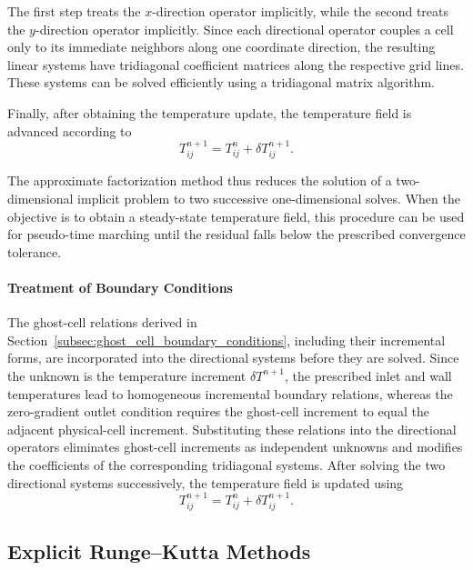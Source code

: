 The first step treats the $x$-direction operator implicitly,
while the second treats the $y$-direction operator
implicitly. Since each directional operator couples a
cell only to its immediate neighbors along one coordinate
direction, the resulting linear systems have tridiagonal
coefficient matrices along the respective grid lines.
These systems can be solved efficiently using a
tridiagonal matrix algorithm.

Finally, after obtaining the temperature update, the
temperature field is advanced according to
\begin{equation}
\boxed{
T_{ij}^{n+1}=T_{ij}^{n}+\delta T_{ij}^{n+1}.
}
\label{eq:temperature_update_final}
\end{equation}

The approximate factorization method thus reduces the
solution of a two-dimensional implicit problem to two
successive one-dimensional solves. When the objective is
to obtain a steady-state temperature field, this procedure
can be used for pseudo-time marching until the residual
falls below the prescribed convergence tolerance.

\paragraph{Treatment of Boundary Conditions}

The ghost-cell relations derived in
Section~\ref{subsec:ghost_cell_boundary_conditions}, including
their incremental forms, are incorporated into the directional
systems before they are solved. Since the unknown is the
temperature increment $\delta T^{n+1}$, the prescribed inlet
and wall temperatures lead to homogeneous incremental
boundary relations, whereas the zero-gradient outlet condition
requires the ghost-cell increment to equal the adjacent
physical-cell increment. Substituting these relations into
the directional operators eliminates ghost-cell increments
as independent unknowns and modifies the coefficients of
the corresponding tridiagonal systems. After solving the
two directional systems successively, the temperature field
is updated using
\begin{equation}
T_{ij}^{n+1}
=
T_{ij}^{n}+\delta T_{ij}^{n+1}.
\end{equation}

\subsection{Explicit Runge--Kutta Methods}
\label{subsec:runge_kutta}

